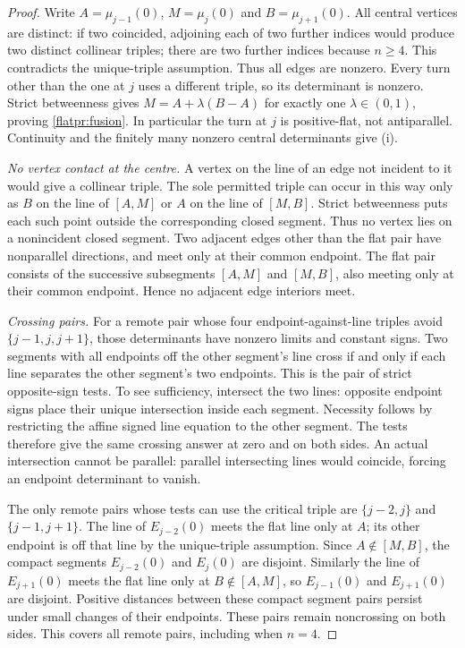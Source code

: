 \begin{proof}\leanok{}
Write $A=\mu_{j-1}(0)$, $M=\mu_j(0)$ and $B=\mu_{j+1}(0)$.
All central vertices are distinct: if two coincided, adjoining each
of two further indices would produce two distinct collinear triples;
there are two further indices because $n\geq4$. This contradicts the
unique-triple assumption. Thus all edges are nonzero. Every turn other
than the one at $j$ uses a different triple, so its determinant is
nonzero. Strict betweenness gives $M=A+\lambda(B-A)$ for exactly one
$\lambda\in(0,1)$, proving \eqref{flatpr:fusion}. In particular the
turn at $j$ is positive-flat, not antiparallel. Continuity and the
finitely many nonzero central determinants give (i).

\emph{No vertex contact at the centre.}
A vertex on the line of an edge not incident to it would give a
collinear triple. The sole permitted triple can occur in this way only
as $B$ on the line of $[A,M]$ or $A$ on the line of $[M,B]$.
Strict betweenness puts each such point outside the corresponding
closed segment. Thus no vertex lies on a nonincident closed segment.
Two adjacent edges other than the flat pair have nonparallel directions,
and meet only at their common endpoint. The flat pair consists of the
successive subsegments $[A,M]$ and $[M,B]$, also meeting only at their
common endpoint. Hence no adjacent edge interiors meet.

\emph{Crossing pairs.}
For a remote pair whose four endpoint-against-line triples avoid
$\{j-1,j,j+1\}$, those determinants have nonzero limits and constant
signs. Two segments with all endpoints off the other segment's line
cross if and only if each line separates the other segment's two
endpoints. This is the pair of strict opposite-sign tests. To see
sufficiency, intersect the two lines: opposite endpoint signs place
their unique intersection inside each segment. Necessity follows by
restricting the affine signed line equation to the other segment.
The tests therefore give the same crossing answer at zero and on both
sides. An actual intersection cannot be parallel: parallel intersecting
lines would coincide, forcing an endpoint determinant to vanish.

The only remote pairs whose tests can use the critical triple are
$\{j-2,j\}$ and $\{j-1,j+1\}$. The line of $E_{j-2}(0)$ meets the
flat line only at $A$; its other endpoint is off that line by the
unique-triple assumption. Since $A\notin[M,B]$, the compact segments
$E_{j-2}(0)$ and $E_j(0)$ are disjoint. Similarly the line of
$E_{j+1}(0)$ meets the flat line only at $B\notin[A,M]$, so
$E_{j-1}(0)$ and $E_{j+1}(0)$ are disjoint. Positive distances between
these compact segment pairs persist under small changes of their
endpoints. These pairs remain noncrossing on both sides. This covers
all remote pairs, including when $n=4$.


\end{proof}
